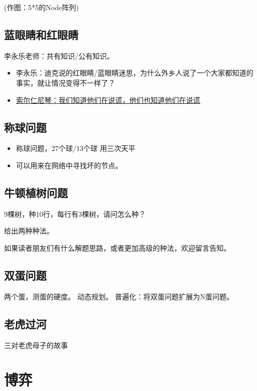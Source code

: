 \documentclass[export, 12pt, letterpaper]{ctexrep}
\begin{document}
(作图：5*5的Node阵列)


\section{蓝眼睛和红眼睛}
李永乐老师：共有知识/公有知识。


\begin{itemize}
\item{ 李永乐：迪克说的红眼睛/蓝眼睛迷思，为什么外乡人说了一个大家都知道的事实，就让情况变得不一样了？ }
\item{ \href{http://cnwmw.blogspot.com/2019/04/blog-post_92.html}{索尔仁尼琴：我们知道他们在说谎，他们也知道他们在说谎} }
\end{itemize}



\section{称球问题}

\begin{itemize}
\item{ 称球问题，27个球/13个球 用三次天平 }
\item{ 可以用来在网络中寻找坏的节点。 }
\end{itemize}



\section{牛顿植树问题}
9棵树，种10行，每行有3棵树，请问怎么种？

给出两种种法。

如果读者朋友们有什么解题思路，或者更加高级的种法，欢迎留言告知。


\section{双蛋问题}
两个蛋，测蛋的硬度。
动态规划。
普遍化：将双蛋问题扩展为N蛋问题。


\section{老虎过河}
三对老虎母子的故事




\chapter{博弈}
\end{document}
